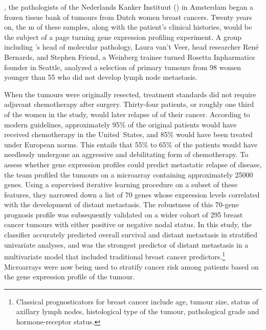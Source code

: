 
, the pathologists of the Nederlands Kanker
Instituut () in Amsterdam began a frozen tissue bank of tumours
from Dutch women breast cancers.  Twenty years on, the m of these
samples, along with the patient's clinical histories, would be the subject of a
page turning gene expression profiling experiment.  A group including
's head of molecular pathology, Laura van't Veer, head researcher
René Bernards, and Stephen Friend, a Weinberg trainee turned Rosetta
Inpharmatics founder in Seattle, analyzed a selection of primary tumours from 98
women younger than 55 who did not develop lymph node
metastasis.\cite{vant_veer_gene_2002}

When the tumours were originally resected, treatment standards did not require
adjuvant chemotherapy after surgery.  Thirty-four patients, or roughly one third
of the women in the study, would later relapse of of their cancer.  According to
modern guidelines, approximately 95\% of the original patients would have
received chemotherapy in the \mbox{United States}, and 85\% would have been
treated under European norms.  This entails that 55\% to 65\% of the patients
would have needlessly undergone an aggressive and debilitating form of
chemotherapy.  To assess whether gene expression profiles could predict
metastatic relapse of disease, the  team profiled the tumours on
a microarray containing approximately \num{25000} genes.  Using a supervised
iterative learning procedure on a subset of these features, they narrowed down a
list of 70 genes whose expression levels correlated with the development of
distant metastasis.  The robustness of this \mbox{70-gene} prognosis profile was
subsequently validated on a wider cohort of 295 breast cancer tumours with
either positive or negative nodal
status.\cite{van_de_vijver_gene-expression_2002} In this study, the classifier
accurately predicted overall survival and distant metastasis in stratified
univariate analyses, and was the strongest predictor of distant metastasis in a
multivariate model that included traditional breast cancer
predictors.\footnote{Classical prognosticators for breast cancer include age,
  tumour size, status of axillary lymph nodes, histological type of the tumour,
  pathological grade and \mbox{hormone-receptor} status.}  Microarrays were now
being used to stratify cancer risk among patients based on the gene expression
profile of the tumour.

